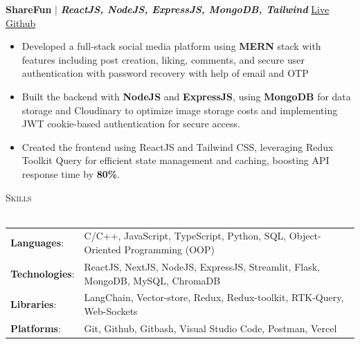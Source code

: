 \documentclass[a4paper]{article}
\newcommand{\lineunder} {
    \vspace*{-8pt} \\
    \hspace*{-18pt} \hrulefill \\
}
\newcommand{\header} [1] {
    {\hspace*{-18pt}\vspace*{6pt} \textsc{#1}}
    \vspace*{-6pt} \lineunder
}
\begin{document}
{\textbf{ShareFun}} {| \sl \textbf{ReactJS, NodeJS, ExpressJS, MongoDB, Tailwind}} \hfill \href{https://sharefun-client.vercel.app}{\color{blue}Live} \hspace{3pt} \href{https://github.com/Aryan123-rgb/FullStackSocialMedia}{\color{blue}Github}  \\

\begin{itemize}
    \vspace{-0.5mm}
    \item Developed a full-stack social media platform using \textbf{MERN} stack with features including post creation, liking, comments, and secure user authentication with password recovery with help of email and OTP
    \vspace{-1mm}
    \item Built the backend with \textbf{NodeJS} and \textbf{ExpressJS}, using \textbf{MongoDB} for data storage and Cloudinary to optimize image storage costs and implementing JWT cookie-based authentication for secure access.
    \vspace{-1mm}
    \item Created the frontend using ReactJS and Tailwind CSS, leveraging Redux Toolkit Query for efficient state management and caching, boosting API response time by \textbf{80\%}.
    
\end{itemize}

\header{Skills}
\vspace{1mm}
\begin{tabular}{@{} l l @{}}
    \textbf{Languages}:            & C/C++, JavaScript, TypeScript, Python, SQL, Object-Oriented Programming (OOP)  \\[1mm]
    \textbf{Technologies}:         &ReactJS, NextJS, NodeJS, ExpressJS, Streamlit, Flask, MongoDB, MySQL, ChromaDB \\[1mm]
    \textbf{Libraries}:            & LangChain, Vector-store, Redux, Redux-toolkit, RTK-Query, Web-Sockets\\[1mm]
    \textbf{Platforms}:            & Git, Github, Gitbash, Visual Studio Code, Postman, Vercel \\
\end{tabular}




\vspace{2mm}
\vspace{1mm}
\end{document}
